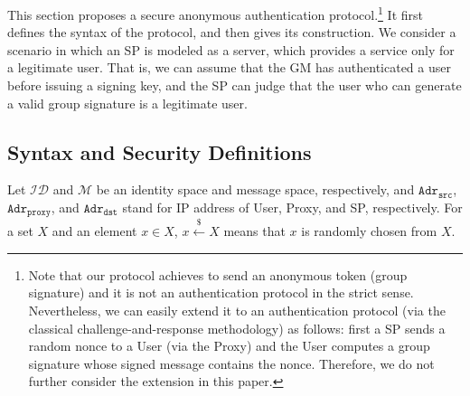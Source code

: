 \documentclass[preprint]{sig-alternate}
\begin{document}
This section proposes a secure anonymous authentication protocol.\footnote{Note that our protocol achieves to send an anonymous token (group signature) and it is not an authentication protocol in the strict sense. Nevertheless, we can easily extend it to an authentication protocol (via the classical challenge-and-response methodology) as follows: first a SP sends a random nonce to a User (via the Proxy) and the User computes a group signature whose signed message contains the nonce. Therefore, we do not further consider the extension in this paper.}
It first defines the syntax of the protocol, 
and then gives its construction. 
We consider a scenario in which an SP is modeled as a server, which provides a service only for a legitimate user. 
That is, we can assume that the GM has authenticated a user before issuing a signing key, and the SP can judge that the user who can generate a valid group signature is a legitimate user. 

\subsection{Syntax and Security Definitions}

Let $\mathcal{ID}$ and $\mathcal{M}$ be an identity space and message space, respectively, 
and $\mathtt{Adr_{src}}$, $\mathtt{Adr_{proxy}}$, and $\mathtt{Adr_{dst}}$ stand for IP address of User, Proxy, and SP, respectively. 
For a set $X$ and an element $x\in X$, $x\stackrel{\$}{\leftarrow}X$ means that $x$ is randomly chosen from $X$. 
\end{document}
